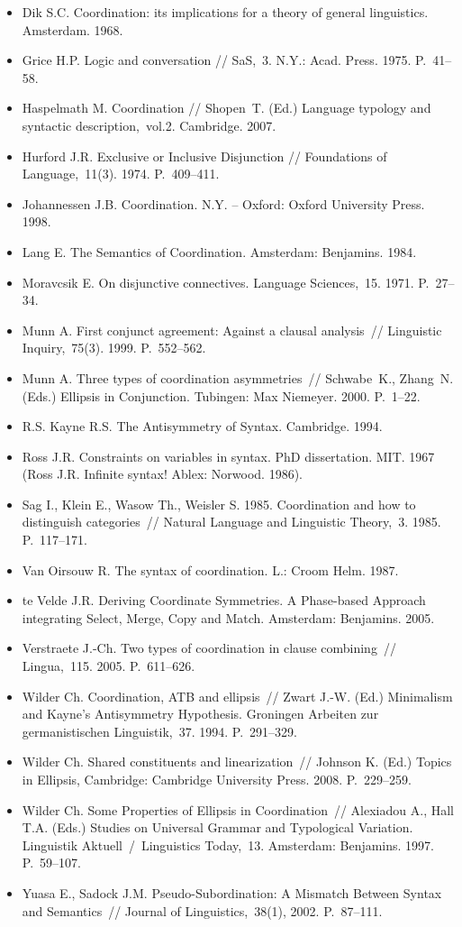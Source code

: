 \begin{itemize}
\item
  Dik S.C. Coordination: its implications for a theory of general
  linguistics. Amsterdam. 1968.
\item
  Grice H.P. Logic and conversation // SaS,~3. N.Y.: Acad. Press. 1975.
  P.~41--58.
\item
  Haspelmath M. Coordination // Shopen~T. (Ed.) Language typology and
  syntactic description,~vol.2. Cambridge. 2007.
\item
  Hurford J.R. Exclusive or Inclusive Disjunction // Foundations of
  Language,~11(3). 1974. P.~409--411.
\item
  Johannessen J.B. Coordination. N.Y. -- Oxford: Oxford University
  Press. 1998.
\item
  Lang E. The Semantics of Coordination. Amsterdam: Benjamins. 1984.
\item
  Moravcsik E. On disjunctive connectives. Language Sciences,~15. 1971.
  P.~27--34.
\item
  Munn A. First conjunct agreement: Against a clausal analysis~//
  Linguistic Inquiry,~75(3). 1999. P.~552--562.
\item
  Munn A. Three types of coordination asymmetries~// Schwabe~K.,
  Zhang~N. (Eds.) Ellipsis in Conjunction. Tubingen: Max Niemeyer. 2000.
  P.~1--22.
\item
  R.S. Kayne R.S. The Antisymmetry of Syntax. Cambridge. 1994.
\item
  Ross J.R. Constraints on variables in syntax. PhD dissertation. MIT.
  1967 (Ross J.R. Infinite syntax! Ablex: Norwood. 1986).
\item
  Sag I., Klein E., Wasow Th., Weisler S. 1985. Coordination and how to
  distinguish categories~// Natural Language and Linguistic Theory,~3.
  1985. P.~117--171.
\item
  Van Oirsouw R. The syntax of coordination. L.: Croom Helm. 1987.
\item
  te Velde J.R. Deriving Coordinate Symmetries. A Phase-based Approach
  integrating Select, Merge, Copy and Match. Amsterdam: Benjamins. 2005.
\item
  Verstraete J.-Ch. Two types of coordination in clause combining~//
  Lingua,~115. 2005. P.~611--626.
\item
  Wilder Ch. Coordination, ATB and ellipsis~// Zwart J.-W. (Ed.)
  Minimalism and Kayne's Antisymmetry Hypothesis. Groningen Arbeiten zur
  germanistischen Linguistik,~37. 1994. P.~291--329.
\item
  Wilder Ch. Shared constituents and linearization~// Johnson K. (Ed.)
  Topics in Ellipsis, Cambridge: Cambridge University Press. 2008.
  P.~229--259.
\item
  Wilder Ch. Some Properties of Ellipsis in Coordination~// Alexiadou
  A., Hall T.A. (Eds.) Studies on Universal Grammar and Typological
  Variation. Linguistik Aktuell~/~Linguistics Today,~13. Amsterdam:
  Benjamins. 1997. P.~59--107.
\item
  Yuasa E., Sadock J.M. Pseudo-Subordination: A Mismatch Between Syntax
  and Semantics~// Journal of Linguistics,~38(1), 2002. P.~87--111.
\end{itemize}

